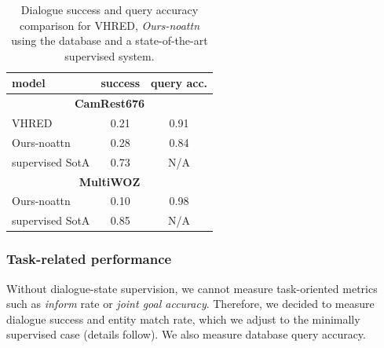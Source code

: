 \begin{table}[tp]
    \centering\small
    \begin{tabular}{lcc}
      \toprule
      model &  success & query acc.\hspace{-2mm} \\
      \midrule
      \multicolumn{3}{c}{\textbf{CamRest676}} \\
      \midrule
      VHRED & 0.21 & 0.91 \\
      Ours-noattn & 0.28 & 0.84 \\\hdashline[0.5pt/2pt]
      supervised SotA \cite{peng2021soloist}\hspace{-2mm} & 0.73 & N/A \\
      \midrule
      \multicolumn{3}{c}{\textbf{MultiWOZ}} \\
      \midrule
      Ours-noattn & 0.10 & 0.98 \\\hdashline[0.5pt/2pt]
      supervised SotA \cite{peng2021soloist}\hspace{-2mm} & 0.85 & N/A \\
      \bottomrule
  \end{tabular}
  \caption{Dialogue success and query accuracy comparison for VHRED, \emph{Ours-noattn} using the database and a state-of-the-art supervised system.}
  \label{tab:success}
\end{table}

\subsubsection{Task-related performance}
\label{05:sec:succ}
Without dialogue-state supervision, we cannot measure task-oriented metrics such as \emph{inform} rate or \emph{joint goal accuracy}.
Therefore, we decided to measure dialogue success and entity match rate, which we adjust to the minimally supervised case (details follow). We also measure database query accuracy.

